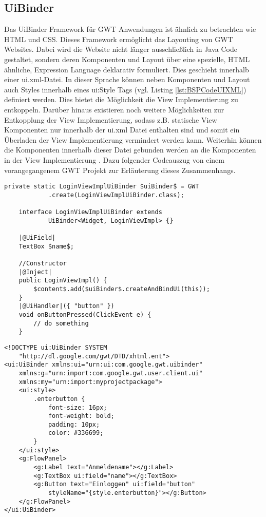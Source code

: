 \subsection{UiBinder}
\label{UiBinder}
Das UiBinder Framework für GWT Anwendungen ist ähnlich zu betrachten wie HTML
und CSS. Dieses Framework ermöglicht das Layouting von GWT Websites. Dabei
wird die Website nicht länger ausschließlich in Java Code gestaltet, sondern
deren Komponenten und Layout über eine spezielle, HTML ähnliche, Expression Language deklarativ
formuliert. Dies geschieht innerhalb einer ui.xml-Datei. In dieser Sprache
können neben Komponenten und Layout auch Styles innerhalb eines ui:Style
Tags (vgl. Listing \ref{lst:BSPCodeUIXML}) definiert werden. Dies bietet die
Möglichkeit die View Implementierung zu entkoppeln. Darüber hinaus existieren noch weitere
Möglichkeiten zur Entkopplung der View Implementierung, sodass z.B.
statische View Komponenten nur innerhalb der ui.xml
Datei enthalten sind und somit ein Überladen der View Implementierung vermindert
werden kann. Weiterhin können die Komponenten innerhalb dieser Datei gebunden
werden an die Komponenten in der View Implementierung \cite{bib:uiBind}. Dazu
folgender Codeauszug von einem vorangegangenem GWT Projekt zur Erläuterung dieses Zusammenhangs.\\
\lstset{language=gwt}
\begin{lstlisting}[caption={Beispielcode UiBinder in View
Implementierung}, label={lst:BSPCodeView}]
	private static LoginViewImplUiBinder $uiBinder$ = GWT
			.create(LoginViewImplUiBinder.class);

	interface LoginViewImplUiBinder extends 
			UiBinder<Widget, LoginViewImpl> {}

	|@UiField|
	TextBox $name$;
		
	//Constructor
	|@Inject|
	public LoginViewImpl() {
		$content$.add($uiBinder$.createAndBindUi(this));
	}
	|@UiHandler|({ "button" })
	void onButtonPressed(ClickEvent e) {
		// do something
	}
\end{lstlisting}
\lstset{language=uixml}
\begin{lstlisting}[caption={Beispielcode UiBinder in ui.xml},
label={lst:BSPCodeUIXML}]
<!DOCTYPE ui:UiBinder SYSTEM 
	"http://dl.google.com/gwt/DTD/xhtml.ent">
<ui:UiBinder xmlns:ui="urn:ui:com.google.gwt.uibinder"
	xmlns:g="urn:import:com.google.gwt.user.client.ui"
	xmlns:my="urn:import:myprojectpackage">
	<ui:style>
		.enterbutton {
			font-size: 16px;
			font-weight: bold;
			padding: 10px;
			color: #336699;
		}
	</ui:style>
	<g:FlowPanel>
		<g:Label text="Anmeldename"></g:Label>
		<g:TextBox ui:field="name"></g:TextBox>
		<g:Button text="Einloggen" ui:field="button" 
			styleName="{style.enterbutton}"></g:Button>
	</g:FlowPanel> 
</ui:UiBinder> 
\end{lstlisting}
